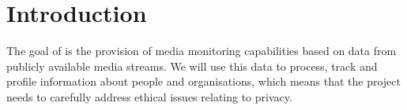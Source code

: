 





\section{Introduction}

The goal of \project is the provision of media monitoring capabilities based on data from publicly available media streams. We will use this data to process, track and profile information about people and organisations, which means that the project needs to carefully address ethical issues relating to privacy.

